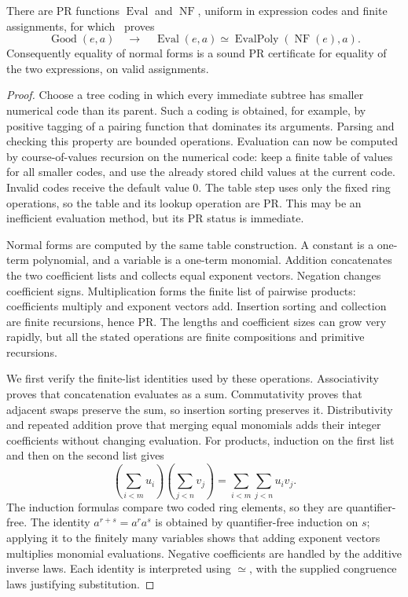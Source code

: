 \begin{proposition}
\label{prop:polynomial-normalization}
There are PR functions $\operatorname{Eval}$ and $\operatorname{NF}$, uniform
in expression codes and finite assignments, for which \ipra\ proves
\[
 \operatorname{Good}(e,a)\quad\longrightarrow\quad
 \operatorname{Eval}(e,a)\simeq
 \operatorname{EvalPoly}(\operatorname{NF}(e),a).
\]
Consequently equality of normal forms is a sound PR certificate for equality
of the two expressions, on valid assignments.
\end{proposition}

\begin{proof}
Choose a tree coding in which every immediate subtree has smaller numerical
code than its parent.  Such a coding is obtained, for example, by positive
tagging of a pairing function that dominates its arguments.  Parsing and
checking this property are bounded operations.  Evaluation can now be
computed by course-of-values recursion on the numerical code: keep a finite
table of values for all smaller codes, and use the already stored child
values at the current code.  Invalid codes receive the default value $0$.
The table step uses only the fixed ring operations, so the table and its
lookup operation are PR.  This may be an inefficient evaluation method,
but its PR status is immediate.

Normal forms are computed by the same table construction.  A constant is a
one-term polynomial, and a variable is a one-term monomial.  Addition
concatenates the two coefficient lists and collects equal exponent vectors.
Negation changes coefficient signs.  Multiplication forms the finite list
of pairwise products: coefficients multiply and exponent vectors add.
Insertion sorting and collection are finite recursions, hence PR.  The
lengths and coefficient sizes can grow very rapidly, but all the stated
operations are finite compositions and primitive recursions.

We first verify the finite-list identities used by these operations.
Associativity proves that concatenation evaluates as a sum.  Commutativity
proves that adjacent swaps preserve the sum, so insertion sorting preserves
it.  Distributivity and repeated addition prove that merging equal monomials
adds their integer coefficients without changing evaluation.  For products,
induction on the first list and then on the second list gives
\[
 \left(\sum_{i<m}u_i\right)\left(\sum_{j<n}v_j\right)
       =\sum_{i<m}\sum_{j<n}u_i v_j.
\]
The induction formulas compare two coded ring elements, so they are
quantifier-free.  The identity $a^{r+s}=a^r a^s$ is obtained by
quantifier-free induction on $s$; applying it to the finitely many variables
shows that adding exponent vectors multiplies monomial evaluations.
Negative coefficients are handled by the additive inverse laws.  Each
identity is interpreted using $\simeq$, with the supplied congruence laws
justifying substitution.


\end{proof}
